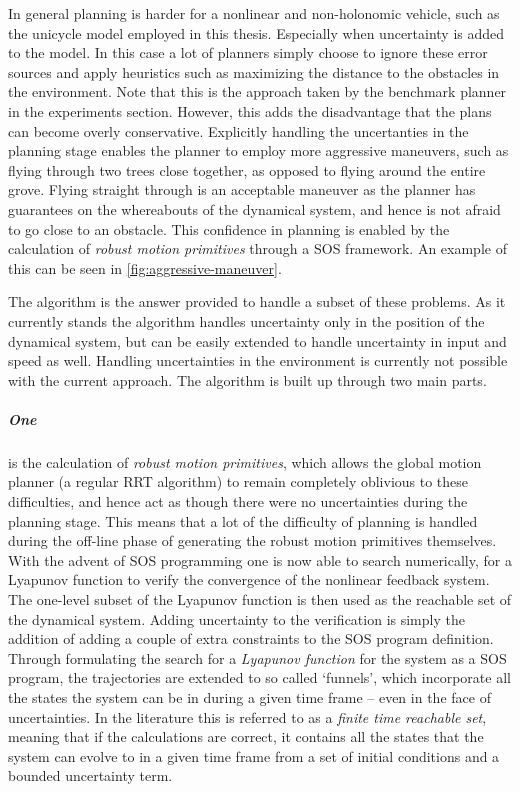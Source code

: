 In general planning is harder for a nonlinear and non-holonomic vehicle, such as
the unicycle model employed in this thesis. Especially when uncertainty is added
to the model. In this case a lot of planners simply choose to ignore these error
sources and apply heuristics such as maximizing the distance to the obstacles in
the environment. Note that this is the approach taken by the benchmark planner
in the experiments section. However, this adds the disadvantage that the plans
can become overly conservative. Explicitly handling the uncertanties in the
planning stage enables the planner to employ more aggressive maneuvers, such as
flying through two trees close together, as opposed to flying around the entire
grove. Flying straight through is an acceptable maneuver as the planner has
guarantees on the whereabouts of the dynamical system, and hence is not afraid
to go close to an obstacle. This confidence in planning is enabled by the
calculation of \textit{robust motion primitives} through a \ac{SOS} framework.
An example of this can be seen in \cref{fig:aggressive-maneuver}.


The \rrtfunnel{} algorithm is the answer provided to handle a subset of these
problems. As it currently stands the algorithm handles uncertainty only in the
position of the dynamical system, but can be easily extended to handle
uncertainty in input and speed as well. Handling uncertainties in the
environment is currently not possible with the current approach. The algorithm
is built up through two main parts.

\subparagraph{One} is the calculation of \textit{robust motion primitives},
which allows the global motion planner (a regular \ac{RRT} algorithm) to remain
completely oblivious to these difficulties, and hence act as though there were
no uncertainties during the planning stage. This means that a lot of the
difficulty of planning is handled during the off-line phase of generating the
robust motion primitives themselves. With the advent of \ac{SOS} programming one
is now able to search numerically, for a Lyapunov function to verify the
convergence of the nonlinear feedback system. The one-level subset of the
Lyapunov function is then used as the reachable set of the dynamical system.
Adding uncertainty to the verification is simply the addition of adding a couple
of extra constraints to the \ac{SOS} program definition. Through formulating the
search for a \textit{Lyapunov function} for the system as a \ac{SOS} program,
the trajectories are extended to so called `funnels', which incorporate all the
states the system can be in during a given time frame -- even in the face of
uncertainties. In the literature this is referred to as a \textit{finite time
  reachable set}, meaning that if the calculations are correct, it contains all
the states that the system can evolve to in a given time frame from a set of
initial conditions and a bounded uncertainty term.


